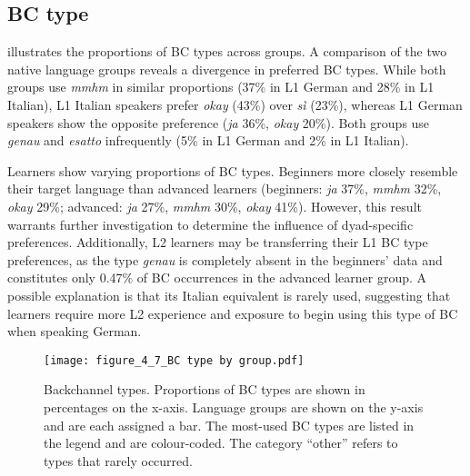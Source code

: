 \subsection{BC type}
\label{sec:4.3.4}
 illustrates the proportions of BC types across groups. A comparison of the two native language groups reveals a divergence in preferred BC types. While both groups use \textit{mmhm} in similar proportions (37\% in L1 German and 28\% in L1 Italian), L1 Italian speakers prefer \textit{okay} (43\%) over \textit{sì} (23\%), whereas L1 German speakers show the opposite preference (\textit{ja} 36\%, \textit{okay} 20\%). Both groups use \textit{genau} and \textit{esatto} infrequently (5\% in L1 German and 2\% in L1 Italian).

Learners show varying proportions of BC types. Beginners more closely resemble their target language than advanced learners (beginners: \textit{ja} 37\%, \textit{mmhm} 32\%, \textit{okay} 29\%; advanced: \textit{ja} 27\%, \textit{mmhm} 30\%, \textit{okay} 41\%). However, this result warrants further investigation to determine the influence of dyad-specific preferences. Additionally, L2 learners may be transferring their L1 BC type preferences, as the type \textit{genau} is completely absent in the beginners' data and constitutes only 0.47\% of BC occurrences in the advanced learner group. A possible explanation is that its Italian equivalent is rarely used, suggesting that learners require more L2 experience and exposure to begin using this type of BC when speaking German.

\begin{figure}[t]
\texttt{[image: figure\_4\_7\_BC type by group.pdf]}
\caption{Backchannel types. Proportions of BC types are shown in percentages on the x-axis. Language groups are shown on the y-axis and are each assigned a bar. The most-used BC types are listed in the legend and are colour-coded. The category “other” refers to types that rarely occurred.}
\label{fig:4.7}
\end{figure}

